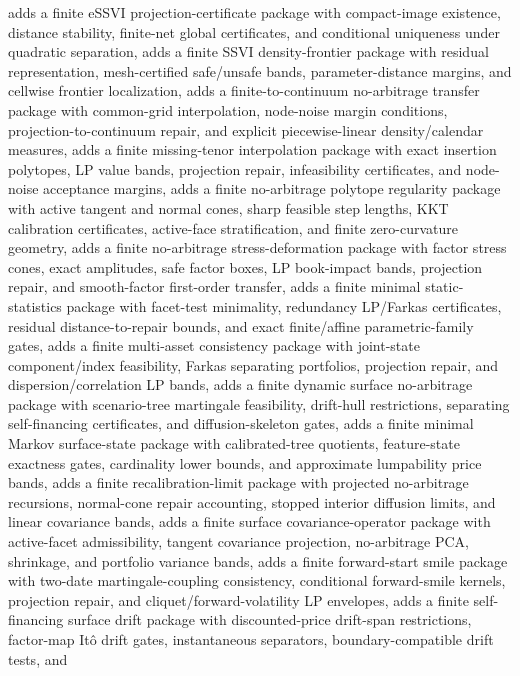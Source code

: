 \documentclass[11pt]{article}
\begin{document}
adds a finite eSSVI projection-certificate package with compact-image
existence, distance stability, finite-net global certificates, and conditional
uniqueness under quadratic separation, adds a finite SSVI density-frontier
package with residual representation, mesh-certified safe/unsafe bands,
parameter-distance margins, and cellwise frontier localization, adds a finite-to-continuum
no-arbitrage transfer package with common-grid interpolation, node-noise margin
conditions, projection-to-continuum repair, and explicit piecewise-linear
density/calendar measures, adds a finite missing-tenor interpolation package
with exact insertion polytopes, LP value bands, projection repair,
infeasibility certificates, and node-noise acceptance margins, adds a finite
no-arbitrage polytope regularity package with active tangent and normal cones,
sharp feasible step lengths, KKT calibration certificates, active-face
stratification, and finite zero-curvature geometry, adds a finite no-arbitrage
stress-deformation package with factor stress cones, exact amplitudes, safe
factor boxes, LP book-impact bands, projection repair, and smooth-factor
first-order transfer, adds a finite minimal static-statistics package with
facet-test minimality, redundancy LP/Farkas certificates, residual
distance-to-repair bounds, and exact finite/affine parametric-family gates,
adds a finite multi-asset consistency package with joint-state component/index
feasibility, Farkas separating portfolios, projection repair, and
dispersion/correlation LP bands, adds a finite dynamic surface no-arbitrage
package with scenario-tree martingale feasibility, drift-hull restrictions,
separating self-financing certificates, and diffusion-skeleton gates, adds a
finite minimal Markov surface-state package with calibrated-tree quotients,
feature-state exactness gates, cardinality lower bounds, and approximate
lumpability price bands, adds a finite recalibration-limit package with
projected no-arbitrage recursions, normal-cone repair accounting, stopped
interior diffusion limits, and linear covariance bands, adds a finite surface
covariance-operator package with active-facet admissibility, tangent covariance
projection, no-arbitrage PCA, shrinkage, and portfolio variance bands, adds a
finite forward-start smile package with two-date martingale-coupling
consistency, conditional forward-smile kernels, projection repair, and
cliquet/forward-volatility LP envelopes, adds a finite self-financing surface
drift package with discounted-price drift-span restrictions, factor-map Itô
drift gates, instantaneous separators, boundary-compatible drift tests, and
\end{document}
